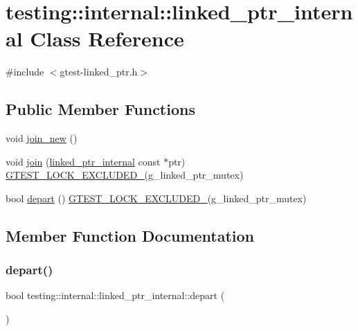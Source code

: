 \hypertarget{classtesting_1_1internal_1_1linked__ptr__internal}{}\section{testing\+::internal\+::linked\+\_\+ptr\+\_\+internal Class Reference}
\label{classtesting_1_1internal_1_1linked__ptr__internal}


{\ttfamily \#include $<$gtest-\/linked\+\_\+ptr.\+h$>$}

\subsection*{Public Member Functions}
\begin{DoxyCompactItemize}
\item 
void \mbox{\hyperlink{classtesting_1_1internal_1_1linked__ptr__internal_a742af1f65df2d5e2b7198a1b74264a83}{join\+\_\+new}} ()
\item 
void \mbox{\hyperlink{classtesting_1_1internal_1_1linked__ptr__internal_acd5a341459f7e81b10b4112d8c764e2a}{join}} (\mbox{\hyperlink{classtesting_1_1internal_1_1linked__ptr__internal}{linked\+\_\+ptr\+\_\+internal}} const $\ast$ptr) \mbox{\hyperlink{gtest-port_8h_a69abff5a4efdd07bd5faebe3dd318d06}{G\+T\+E\+S\+T\+\_\+\+L\+O\+C\+K\+\_\+\+E\+X\+C\+L\+U\+D\+E\+D\+\_\+}}(g\+\_\+linked\+\_\+ptr\+\_\+mutex)
\item 
bool \mbox{\hyperlink{classtesting_1_1internal_1_1linked__ptr__internal_a8699e539d9702d363ef0351012d1b3ca}{depart}} () \mbox{\hyperlink{gtest-port_8h_a69abff5a4efdd07bd5faebe3dd318d06}{G\+T\+E\+S\+T\+\_\+\+L\+O\+C\+K\+\_\+\+E\+X\+C\+L\+U\+D\+E\+D\+\_\+}}(g\+\_\+linked\+\_\+ptr\+\_\+mutex)
\end{DoxyCompactItemize}


\subsection{Member Function Documentation}
\mbox{\label{classtesting_1_1internal_1_1linked__ptr__internal_a8699e539d9702d363ef0351012d1b3ca}} 
\subsubsection{\texorpdfstring{depart()}{depart()}}
{\footnotesize\ttfamily bool testing\+::internal\+::linked\+\_\+ptr\+\_\+internal\+::depart (\begin{DoxyParamCaption}{ }\end{DoxyParamCaption})\hspace{0.3cm}{\ttfamily [inline]}}

